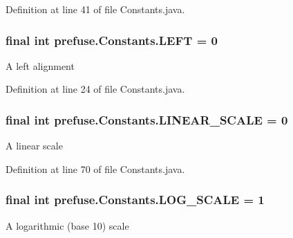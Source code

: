 \-Definition at line 41 of file \-Constants.\-java.

\hypertarget{interfaceprefuse_1_1_constants_a5cc22edffb16f306d73a6e4962071eaa}{
\subsubsection[{\-L\-E\-F\-T}]{\setlength{\rightskip}{0pt plus 5cm}final int {\bf prefuse.\-Constants.\-L\-E\-F\-T} = 0}}\label{interfaceprefuse_1_1_constants_a5cc22edffb16f306d73a6e4962071eaa}
\-A left alignment 

\-Definition at line 24 of file \-Constants.\-java.

\hypertarget{interfaceprefuse_1_1_constants_ab54b5d45605aa12251d02630a8053175}{
\subsubsection[{\-L\-I\-N\-E\-A\-R\-\_\-\-S\-C\-A\-L\-E}]{\setlength{\rightskip}{0pt plus 5cm}final int {\bf prefuse.\-Constants.\-L\-I\-N\-E\-A\-R\-\_\-\-S\-C\-A\-L\-E} = 0}}\label{interfaceprefuse_1_1_constants_ab54b5d45605aa12251d02630a8053175}
\-A linear scale 

\-Definition at line 70 of file \-Constants.\-java.

\hypertarget{interfaceprefuse_1_1_constants_afa0c75e806145930d22d15275e97af1a}{
\subsubsection[{\-L\-O\-G\-\_\-\-S\-C\-A\-L\-E}]{\setlength{\rightskip}{0pt plus 5cm}final int {\bf prefuse.\-Constants.\-L\-O\-G\-\_\-\-S\-C\-A\-L\-E} = 1}}\label{interfaceprefuse_1_1_constants_afa0c75e806145930d22d15275e97af1a}
\-A logarithmic (base 10) scale 

